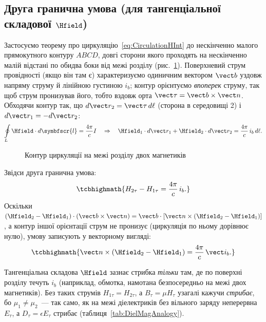 \subsection*{Друга гранична умова (для тангенціальної складової $\Hfield$)}

Застосуємо теорему про циркуляцію~\eqref{eq:CirculationHInt} до нескінченно малого прямокутного контуру $ABCD$, довгі сторони якого проходять
на нескінченно малій відстані по обидва боки від межі розділу (рис.~\ref{pic:BC2Mag}). Поверхневий струм провідності (якщо він там є)
характеризуємо одиничним вектором $\vect b$ уздовж напряму струму й лінійною густиною $i_b$; контур орієнтуємо \emph{впоперек} струму, так щоб
струм пронизував його, тобто вздовж орта $\vect\tau = \vect b\times\vect n$. Обходячи контур так, що $d\vect r_2 = \vect\tau\, d\ell$ (сторона в
середовищі 2) і $d\vect r_1 = -d\vect r_2$:
\begin{equation*}
	\oint\limits_L \Hfield\cdot d\symbfscr{l} = \frac{4\pi}c I \quad\Rightarrow\quad \Hfield_1\cdot d\vect r_1 + \Hfield_2\cdot d\vect r_2 =
	\frac{4\pi}c\, i_b\, d\ell.
\end{equation*}

\begin{figure}[h!]\centering
	\caption{Контур циркуляції на межі розділу двох магнетиків\label{pic:BC2Mag}}
\end{figure}

Звідси друга гранична умова:
\begin{equation}\label{eq:BC2MagneticScalar}
	\tcbhighmath{
		H_{2\tau} - H_{1\tau} = \frac{4\pi}c\, i_b.
	}
\end{equation}
Оскільки $(\Hfield_2-\Hfield_1)\cdot(\vect b\times\vect n)=\vect b\cdot[\vect n\times(\Hfield_2-\Hfield_1)]$, а контур іншої орієнтації струм не пронизує (циркуляція по ньому дорівнює нулю), умову записують у векторному вигляді:
\begin{equation}\label{eq:BC2MagneticVector}
	\tcbhighmath{
		\vect n\times\left(\Hfield_2 - \Hfield_1\right) = \frac{4\pi}c\, \vect i_b.
	}
\end{equation}

\begin{Attention}[unbreakable]
	Тангенціальна складова $\Hfield$ зазнає стрибка \emph{тільки} там, де по поверхні розділу течуть  $i_b$ (наприклад, обмотка, намотана безпосередньо на межі двох магнетиків). Без таких струмів $H_{1\tau}=H_{2\tau}$, а $B_\tau=\mu H_\tau$ узагалі кажучи \emph{стрибає}, бо $\mu_1\neq\mu_2$~--- так само, як на межі діелектриків без вільного заряду неперервна $E_\tau$, а $D_\tau=\epsilon E_\tau$ стрибає (таблиця~\ref{tab:DielMagAnalogy}).
\end{Attention}

